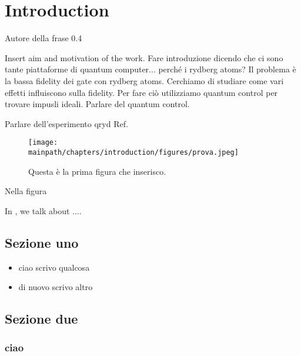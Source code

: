 \documentclass[\mainpath/main/main.tex]{subfiles}
\begin{document}


\chapter[Introduction]{Introduction}
\label{ch:introduction}


%
{Autore della frase}%
{0.4\linewidth}

\noindent Insert aim and motivation of the work. Fare introduzione dicendo che ci sono tante piattaforme di quantum computer... perché i rydberg atoms? Il problema è la bassa fidelity dei gate con rydberg atoms. Cerchiamo di studiare come vari effetti influiscono sulla fidelity. Per fare ciò utilizziamo quantum control per trovare impusli ideali. Parlare del quantum control.

Parlare dell'esperimento qryd Ref.~\cite{Aaronson2011}


\begin{figure}[h!]
\centering
\texttt{[image: \\mainpath/chapters/introduction/figures/prova.jpeg]}
\caption[Short caption]{\label{fig:} Questa è la prima figura che inserisco.}
\end{figure}

Nella figura 

In , we talk about ....

\section{Sezione uno}

\lipsum[1]

\begin{itemize}
\item ciao scrivo qualcosa
\item di nuovo scrivo altro
\end{itemize}

\section{Sezione due}

\subsection{ciao}
\end{document}

